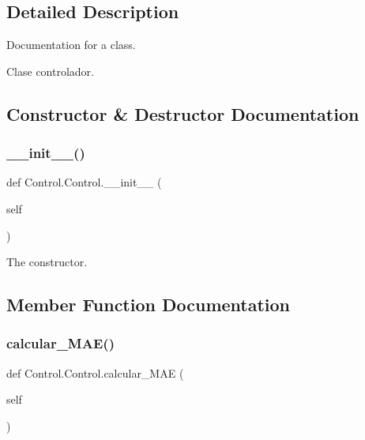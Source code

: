 \subsection{Detailed Description}
Documentation for a class. 

Clase controlador. 

\subsection{Constructor \& Destructor Documentation}
\mbox{\label{class_control_1_1_control_acbf9737a141c25fda2909c24f68cb75e}} 
\subsubsection{\texorpdfstring{\+\_\+\+\_\+init\+\_\+\+\_\+()}{\_\_init\_\_()}}
{\footnotesize\ttfamily def Control.\+Control.\+\_\+\+\_\+init\+\_\+\+\_\+ (\begin{DoxyParamCaption}\item[{}]{self }\end{DoxyParamCaption})}



The constructor. 



\subsection{Member Function Documentation}
\mbox{\label{class_control_1_1_control_a01b94321309bbd777b1d147559ba8163}} 
\subsubsection{\texorpdfstring{calcular\+\_\+\+M\+A\+E()}{calcular\_MAE()}}
{\footnotesize\ttfamily def Control.\+Control.\+calcular\+\_\+\+M\+AE (\begin{DoxyParamCaption}\item[{}]{self }\end{DoxyParamCaption})}


